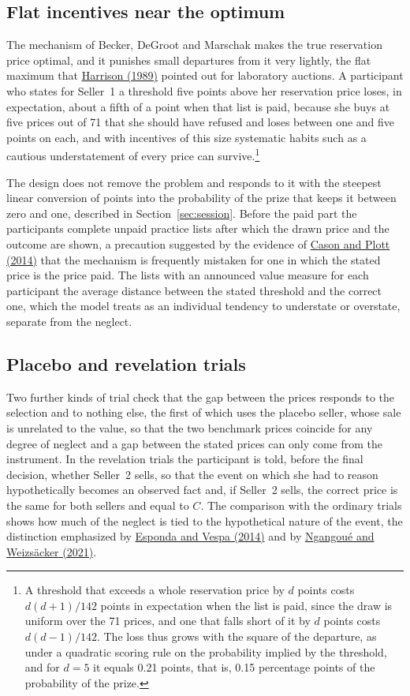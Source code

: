 \documentclass[11pt,a4paper]{article}
\newcommand{\cy}[2]{\hyperlink{cite.#1}{\textcolor{citecolor}{#2}}}
\begin{document}
\subsection{Flat incentives near the optimum}\label{sec:flat}

The mechanism of Becker, DeGroot and Marschak makes the true reservation price optimal, and it punishes small departures from it very lightly, the flat maximum that \cy{harrison}{Harrison (1989)} pointed out for laboratory auctions. A participant who states for Seller~1 a threshold five points above her reservation price loses, in expectation, about a fifth of a point when that list is paid, because she buys at five prices out of 71 that she should have refused and loses between one and five points on each, and with incentives of this size systematic habits such as a cautious understatement of every price can survive.\footnote{A threshold that exceeds a whole reservation price by $d$ points costs $d(d+1)/142$ points in expectation when the list is paid, since the draw is uniform over the 71 prices, and one that falls short of it by $d$ points costs $d(d-1)/142$. The loss thus grows with the square of the departure, as under a quadratic scoring rule on the probability implied by the threshold, and for $d=5$ it equals 0.21 points, that is, 0.15 percentage points of the probability of the prize.}

The design does not remove the problem and responds to it with the steepest linear conversion of points into the probability of the prize that keeps it between zero and one, described in Section~\ref{sec:session}. Before the paid part the participants complete unpaid practice lists after which the drawn price and the outcome are shown, a precaution suggested by the evidence of \cy{casonplott}{Cason and Plott (2014)} that the mechanism is frequently mistaken for one in which the stated price is the price paid. The lists with an announced value measure for each participant the average distance between the stated threshold and the correct one, which the model treats as an individual tendency to understate or overstate, separate from the neglect.

\subsection{Placebo and revelation trials}

Two further kinds of trial check that the gap between the prices responds to the selection and to nothing else, the first of which uses the placebo seller, whose sale is unrelated to the value, so that the two benchmark prices coincide for any degree of neglect and a gap between the stated prices can only come from the instrument. In the revelation trials the participant is told, before the final decision, whether Seller~2 sells, so that the event on which she had to reason hypothetically becomes an observed fact and, if Seller~2 sells, the correct price is the same for both sellers and equal to $C$. The comparison with the ordinary trials shows how much of the neglect is tied to the hypothetical nature of the event, the distinction emphasized by \cy{espondavespa}{Esponda and Vespa (2014)} and by \cy{ngangoue}{Ngangou\'e and Weizs\"acker (2021)}.
\end{document}
